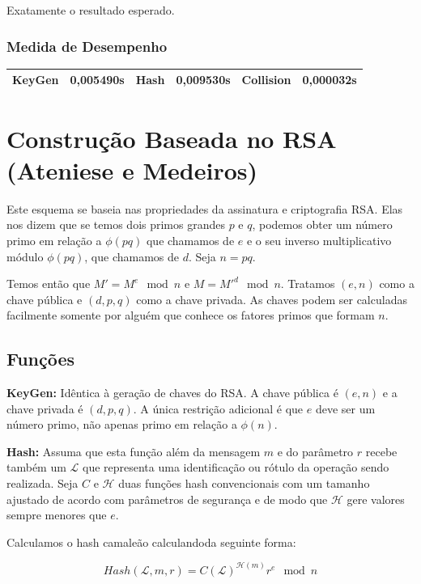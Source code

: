 \documentclass[a4paper]{article}
\begin{document}
Exatamente o resultado esperado.

\subsubsection{Medida de Desempenho}

\begin{center}
\begin{tabular}{|c|c|c|c|c|c|}
  \hline
  KeyGen & 0,005490s & Hash & 0,009530s & Collision & 0,000032s\\
  \hline
\end{tabular}
\end{center}


\section{Construção Baseada no RSA (Ateniese e Medeiros) \cite{ateniese}}

Este esquema se baseia nas propriedades da assinatura e criptografia
RSA. Elas nos dizem que se temos dois primos grandes $p$ e $q$,
podemos obter um número primo em relação a $\phi(pq)$ que chamamos de
$e$ e o seu inverso multiplicativo módulo $\phi(pq)$, que chamamos de
$d$. Seja $n=pq$.

Temos então que $M'=M^e \mod n$ e $M=M'^d \mod n$. Tratamos $(e, n)$
como a chave pública e $(d, p, q)$ como a chave privada. As chaves
podem ser calculadas facilmente somente por alguém que conhece os
fatores primos que formam $n$.

\subsection{Funções}

\textbf{KeyGen: } Idêntica à geração de chaves do RSA. A chave pública
é $(e, n)$ e a chave privada é $(d, p, q)$. A única restrição
adicional é que $e$ deve ser um número primo, não apenas primo em
relação a $\phi(n)$.

\textbf{Hash: } Assuma que esta função além da mensagem $m$ e do
parâmetro $r$ recebe também um $\mathcal{L}$ que representa uma
identificação ou rótulo da operação sendo realizada. Seja $C$ e
$\mathcal{H}$ duas funções hash convencionais com um tamanho ajustado
de acordo com parâmetros de segurança e de modo que $\mathcal{H}$ gere
valores sempre menores que $e$.

Calculamos o hash camaleão calculandoda seguinte forma:

$$
Hash(\mathcal{L}, m, r) = C(\mathcal{L})^{\mathcal{H}(m)}r^e \mod n
$$
\end{document}
